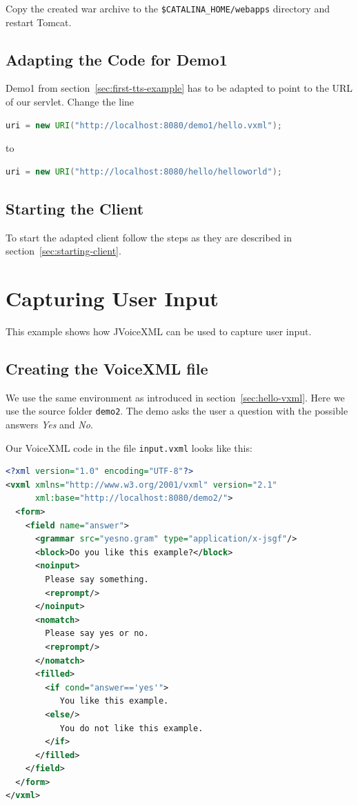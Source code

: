 \documentclass[11pt,a4paper]{article}
\begin{document}
Copy the created war archive to the \texttt{\$CATALINA\_HOME/web\-apps}
directory and restart Tomcat.

\subsection{Adapting the Code for Demo1}

Demo1 from section~\ref{sec:first-tts-example} has to be adapted to point to
the URL of our servlet. Change the line
\begin{lstlisting}[language=Java]
uri = new URI("http://localhost:8080/demo1/hello.vxml");
\end{lstlisting}
to
\begin{lstlisting}[language=Java]
uri = new URI("http://localhost:8080/hello/helloworld");
\end{lstlisting}

\subsection{Starting the Client}

To start the adapted client follow the steps as they are described in
section~\ref{sec:starting-client}.

\section{Capturing User Input}

This example shows how JVoiceXML can be used to capture user input. 

\subsection{Creating the VoiceXML file}

We use the same environment as introduced in section~\ref{sec:hello-vxml}. Here
we use the source folder \texttt{demo2}.
The demo asks the user a question with the possible answers
\emph{Yes} and \emph{No}.

Our VoiceXML code in the file \texttt{input.vxml} looks like this:

\begin{lstlisting}[language=XML]
<?xml version="1.0" encoding="UTF-8"?> 
<vxml xmlns="http://www.w3.org/2001/vxml" version="2.1"
      xml:base="http://localhost:8080/demo2/">
  <form>
    <field name="answer">
      <grammar src="yesno.gram" type="application/x-jsgf"/>
      <block>Do you like this example?</block>
      <noinput>
        Please say something.
        <reprompt/>
      </noinput>
      <nomatch>
        Please say yes or no.
        <reprompt/>
      </nomatch>
      <filled>
        <if cond="answer=='yes'">
           You like this example.
        <else/>
           You do not like this example.
        </if>
      </filled>
    </field>
  </form>
</vxml>
\end{lstlisting}
\end{document}
